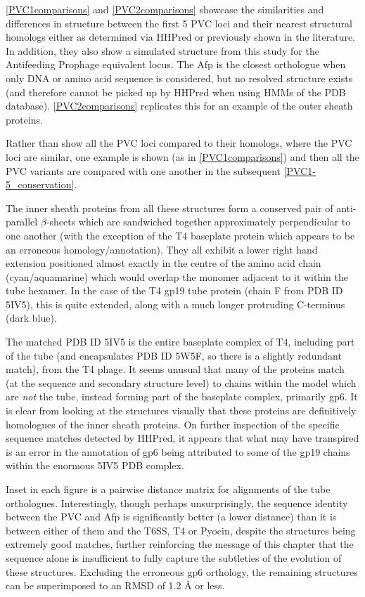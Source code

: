\vref{PVC1comparisons} and \vref{PVC2comparisons} showcase the similarities and differences in structure between the first 5 PVC loci and their nearest structural homologs either as determined via HHPred or previously shown in the literature. In addition, they also show a simulated structure from this study for the Antifeeding Prophage equivalent locus. The Afp is the closest orthologue when only DNA or amino acid sequence is considered, but no resolved structure exists (and therefore cannot be picked up by HHPred when using HMMs of the PDB database). \vref{PVC2comparisons} replicates this for an example of the outer sheath proteins.

Rather than show all the PVC loci compared to their homologs, where the PVC loci are similar, one example is shown (as in \vref{PVC1comparisons}) and then all the PVC variants are compared with one another in the subsequent \vref{PVC1-5_conservation}.

The inner sheath proteins from all these structures form a conserved pair of anti-parallel $\beta$-sheets which are sandwiched together approximately perpendicular to one another (with the exception of the T4 baseplate protein which appears to be an erroneous homology/annotation). They all exhibit a lower right hand extension positioned almost exactly in the centre of the amino acid chain (cyan/aquamarine) which would overlap the monomer adjacent to it within the tube hexamer. In the case of the T4 gp19 tube protein (chain F from PDB ID 5IV5), this is quite extended, along with a much longer protruding C-terminus (dark blue).

The matched PDB ID 5IV5 is the entire baseplate complex of T4, including part of the tube (and encapsulates PDB ID 5W5F, so there is a slightly redundant match), from the T4 phage. It seems unusual that many of the proteins match (at the sequence and secondary structure level) to chains within the model which are \emph{not} the tube, instead forming part of the baseplate complex, primarily gp6. It is clear from looking at the structures visually that these proteins are definitively homologues of the inner sheath proteins. On further inspection of the specific sequence matches detected by HHPred, it appears that what may have transpired is an error in the annotation of gp6 being attributed to some of the gp19 chains within the enormous 5IV5 PDB complex.

Inset in each figure is a pairwise distance matrix for alignments of the tube orthologues. Interestingly, though perhaps unsurprisingly, the sequence identity between the PVC and Afp is significantly better (a lower distance) than it is between either of them and the T6SS, T4 or Pyocin, despite the structures being extremely good matches, further reinforcing the message of this chapter that the sequence alone is insufficient to fully capture the subtleties of the evolution of these structures. Excluding the erroneous gp6 orthology, the remaining structures can be superimposed to an RMSD of 1.2 \AA{} or less.


